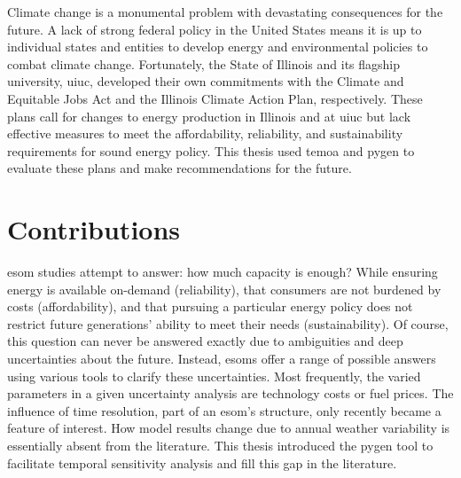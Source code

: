 Climate change is a monumental problem with devastating consequences for the future.
A lack of strong federal policy in the United States means it is up to individual
states and entities to develop energy and environmental policies to combat climate
change. Fortunately, the State of Illinois and its flagship university, \gls{uiuc},
developed their own commitments with the Climate and Equitable Jobs Act and
the Illinois Climate Action Plan, respectively. These plans call for changes
to energy production in Illinois and at \gls{uiuc} but lack effective measures
to meet the affordability, reliability, and sustainability requirements for sound
energy policy. This thesis used \gls{temoa} and \gls{pygen} to evaluate these
plans and make recommendations for the future.

\section{Contributions}

\gls{esom} studies attempt to answer: how much capacity is enough? While
ensuring energy is available on-demand (reliability), that consumers are not
burdened by costs (affordability), and that pursuing a particular energy policy
does not restrict future generations' ability to meet their needs (sustainability).
Of course, this question can never be answered exactly due to ambiguities and deep
uncertainties about the future. Instead, \glspl{esom} offer a range of possible answers
using various tools to clarify these uncertainties. Most frequently, the varied
parameters in a given uncertainty analysis are technology
costs or fuel prices. The influence of time resolution, part of an \gls{esom}'s
structure, only recently became a feature of interest. How model results change
due to annual weather variability is essentially absent from the literature.
This thesis introduced the \gls{pygen} tool to facilitate temporal sensitivity
analysis and fill this gap in the literature.

